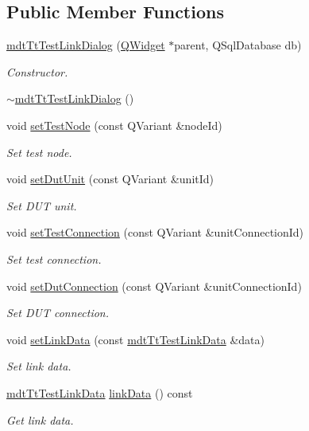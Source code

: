 \subsection*{Public Member Functions}
\begin{DoxyCompactItemize}
\item 
\hyperlink{classmdt_tt_test_link_dialog_ac65efc1af939c5059176651d65d3c7ae}{mdt\-Tt\-Test\-Link\-Dialog} (\hyperlink{class_q_widget}{Q\-Widget} $\ast$parent, Q\-Sql\-Database db)
\begin{DoxyCompactList}\small\item\em Constructor. \end{DoxyCompactList}\item 
\hyperlink{classmdt_tt_test_link_dialog_a5732e2c5680256dd468540ae47172fbe}{$\sim$mdt\-Tt\-Test\-Link\-Dialog} ()
\item 
void \hyperlink{classmdt_tt_test_link_dialog_a82c51c0f0fc03eaa731297cf3bdf4f10}{set\-Test\-Node} (const Q\-Variant \&node\-Id)
\begin{DoxyCompactList}\small\item\em Set test node. \end{DoxyCompactList}\item 
void \hyperlink{classmdt_tt_test_link_dialog_a0a67dbfcdac8800ef091fc040539b148}{set\-Dut\-Unit} (const Q\-Variant \&unit\-Id)
\begin{DoxyCompactList}\small\item\em Set D\-U\-T unit. \end{DoxyCompactList}\item 
void \hyperlink{classmdt_tt_test_link_dialog_a0466396e733c0e20f5c8fe1cc11fb8ec}{set\-Test\-Connection} (const Q\-Variant \&unit\-Connection\-Id)
\begin{DoxyCompactList}\small\item\em Set test connection. \end{DoxyCompactList}\item 
void \hyperlink{classmdt_tt_test_link_dialog_a3fc219ea7c9e271848f181ed00ca7156}{set\-Dut\-Connection} (const Q\-Variant \&unit\-Connection\-Id)
\begin{DoxyCompactList}\small\item\em Set D\-U\-T connection. \end{DoxyCompactList}\item 
void \hyperlink{classmdt_tt_test_link_dialog_ad5ba0637cab1c517a541742abc1dfbb4}{set\-Link\-Data} (const \hyperlink{classmdt_tt_test_link_data}{mdt\-Tt\-Test\-Link\-Data} \&data)
\begin{DoxyCompactList}\small\item\em Set link data. \end{DoxyCompactList}\item 
\hyperlink{classmdt_tt_test_link_data}{mdt\-Tt\-Test\-Link\-Data} \hyperlink{classmdt_tt_test_link_dialog_a0af064a9831a15e5b0478e9346d802c6}{link\-Data} () const 
\begin{DoxyCompactList}\small\item\em Get link data. \end{DoxyCompactList}\end{DoxyCompactItemize}
